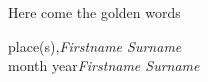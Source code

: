 %
%

\preface

Here come the golden words

\vspace{1cm}
\begin{flushright}\noindent
place(s),\hfill {\it Firstname  Surname}\\
month year\hfill {\it Firstname  Surname}\\
\end{flushright}


